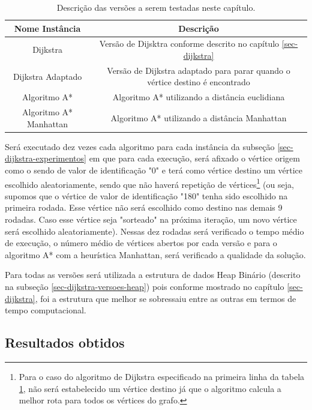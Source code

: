 \begin{table}[H]
\caption{Descrição das versões a serem testadas neste capítulo.}
\label{tbl-aestrela-instancias}
\centering
\begin{adjustbox}{max width=\textwidth}
\begin{tabular}{|c|c|}
\hline 
\textbf{Nome Instância} & \textbf{Descrição} \\ 
\hline 
Dijkstra & Versão de Dijsktra conforme descrito no capítulo \ref{sec-dijkstra} \\ 
\hline 
Dijkstra Adaptado & Versão de Dijkstra adaptado para parar quando o vértice destino é encontrado \\ 
\hline 
Algoritmo A* & Algoritmo A* utilizando a distância euclidiana \\ 
\hline 
Algoritmo A* Manhattan & Algoritmo A* utilizando a distância Manhattan \\ 
\hline 
\end{tabular} 
\end{adjustbox}
\end{table}

Será executado dez vezes cada algoritmo para cada instância da subseção \ref{sec-dijkstra-experimentos} em que para cada execução, será afixado o vértice origem como o sendo de valor de identificação "0" e terá como vértice destino um vértice escolhido aleatoriamente, sendo que não haverá repetição de vértices\footnote{Para o caso do algoritmo de Dijkstra especificado na primeira linha da tabela \ref{tbl-aestrela-instancias}, não será estabelecido um vértice destino já que o algoritmo calcula a melhor rota para todos os vértices do grafo.} (ou seja, supomos que o vértice de valor de identificação "180" tenha sido escolhido na primeira rodada. Esse vértice não será escolhido como destino nas demais 9 rodadas. Caso esse vértice seja "sorteado" na próxima iteração, um novo vértice será escolhido aleatoriamente). Nessas dez rodadas será verificado o tempo médio de execução, o número médio de vértices abertos por cada versão e para o algoritmo A* com a heurística Manhattan, será verificado a qualidade da solução.

Para todas as versões será utilizada a estrutura de dados Heap Binário (descrito na subseção \ref{sec-dijkstra-versoes-heap}) pois conforme mostrado no capítulo \ref{sec-dijkstra}, foi a estrutura que melhor se sobressaiu entre as outras em termos de tempo computacional.

\subsection{Resultados obtidos}
\label{sec-aestrela-instancias-resultados}

